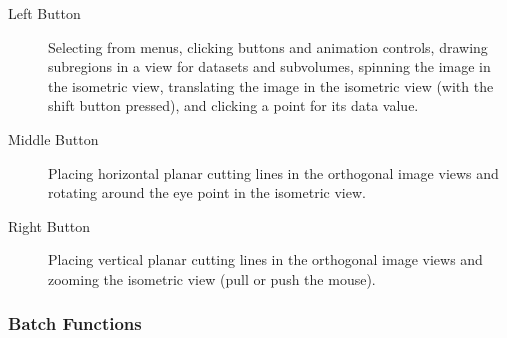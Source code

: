 \documentclass{article}
\begin{document}
\begin{description}
\item [Left Button]  Selecting from menus, clicking buttons and animation controls,
drawing subregions in a view for datasets and subvolumes, spinning the image
in the isometric view, translating the image in the isometric view (with the
shift button pressed), and clicking a point for its data value.

\item [Middle Button]  Placing horizontal planar cutting lines in the
orthogonal image views and rotating around the eye point in the isometric view.

\item [Right Button]   Placing vertical planar cutting lines in the
orthogonal image views and zooming the isometric view (pull or push the mouse).

\end{description}


\subsubsection{Batch Functions}
\end{document}
